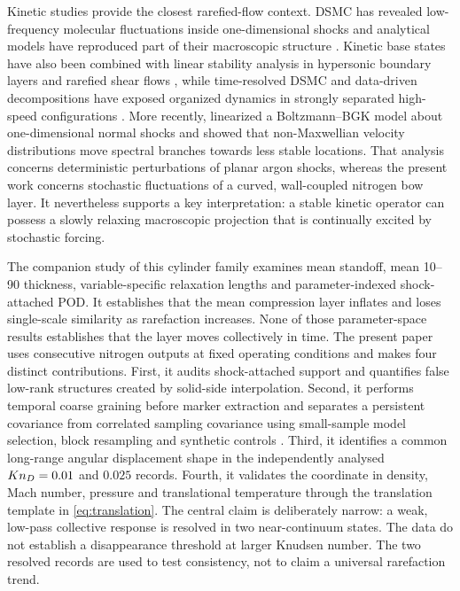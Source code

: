 Kinetic studies provide the closest rarefied-flow context. DSMC has revealed low-frequency molecular fluctuations inside one-dimensional shocks and analytical models have reproduced part of their macroscopic structure \citep{Sawant2021,Sawant2022}. Kinetic base states have also been combined with linear stability analysis in hypersonic boundary layers and rarefied shear flows \citep{Klothakis2022,Zou2023}, while time-resolved DSMC and data-driven decompositions have exposed organized dynamics in strongly separated high-speed configurations \citep{Karpuzcu2025}. More recently, \citet{Karpuzcu2026} linearized a Boltzmann--BGK model about one-dimensional normal shocks and showed that non-Maxwellian velocity distributions move spectral branches towards less stable locations. That analysis concerns deterministic perturbations of planar argon shocks, whereas the present work concerns stochastic fluctuations of a curved, wall-coupled nitrogen bow layer. It nevertheless supports a key interpretation: a stable kinetic operator can possess a slowly relaxing macroscopic projection that is continually excited by stochastic forcing.

The companion study of this cylinder family \citep{RoohiShoja2026Mean} examines mean standoff, mean 10--90 thickness, variable-specific relaxation lengths and parameter-indexed shock-attached POD. It establishes that the mean compression layer inflates and loses single-scale similarity as rarefaction increases. None of those parameter-space results establishes that the layer moves collectively in time. The present paper uses consecutive nitrogen outputs at fixed operating conditions and makes four distinct contributions. First, it audits shock-attached support and quantifies false low-rank structures created by solid-side interpolation. Second, it performs temporal coarse graining before marker extraction and separates a persistent covariance from correlated sampling covariance using small-sample model selection, block resampling and synthetic controls \citep{Akaike1974,HurvichTsai1989,Kunsch1989,PolitisRomano1994,Higham2002}. Third, it identifies a common long-range angular displacement shape in the independently analysed $Kn_D=0.01$ and $0.025$ records. Fourth, it validates the coordinate in density, Mach number, pressure and translational temperature through the translation template in \cref{eq:translation}. The central claim is deliberately narrow: a weak, low-pass collective response is resolved in two near-continuum states. The data do not establish a disappearance threshold at larger Knudsen number. The two resolved records are used to test consistency, not to claim a universal rarefaction trend.
